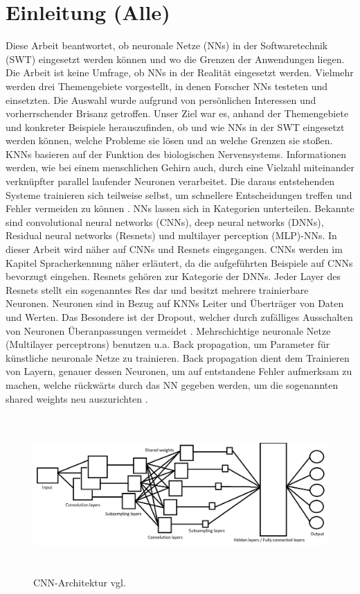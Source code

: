 \section{Einleitung (Alle)}
Diese Arbeit beantwortet, ob neuronale Netze (NNs) in der Softwaretechnik (SWT) eingesetzt werden können und wo die Grenzen der Anwendungen liegen. Die Arbeit ist keine Umfrage, ob NNs in der Realität eingesetzt werden. Vielmehr werden drei Themengebiete vorgestellt, in denen Forscher NNs testeten und einsetzten. Die Auswahl wurde aufgrund von persönlichen Interessen und vorherrschender Brisanz getroffen. Unser Ziel war es, anhand der Themengebiete und konkreter Beispiele herauszufinden, ob und wie NNs in der SWT eingesetzt werden können, welche Probleme sie lösen und an welche Grenzen sie stoßen.
KNNs basieren auf der Funktion des biologischen Nervensystems. Informationen werden, wie bei einem menschlichen Gehirn auch, durch eine Vielzahl miteinander verknüpfter parallel laufender Neuronen  verarbeitet. Die daraus entstehenden Systeme trainieren sich teilweise selbst, um schnellere Entscheidungen treffen und Fehler vermeiden zu können \cite{technology}. 
NNs lassen sich in Kategorien unterteilen. Bekannte sind convolutional neural networks (CNNs), deep neural networks (DNNs), Residual neural networks (Resnets) und multilayer perception (MLP)-NNs. In dieser Arbeit wird näher auf CNNs und Resnets eingegangen. CNNs werden im Kapitel Spracherkennung näher erläutert, da die aufgeführten Beispiele auf CNNs bevorzugt eingehen. Resnets gehören zur Kategorie der DNNs. Jeder Layer des Resnets stellt ein sogenanntes Res dar und besitzt mehrere trainierbare Neuronen. Neuronen sind in Bezug auf KNNs Leiter und Überträger von Daten und Werten. Das Besondere ist der Dropout, welcher durch zufälliges Ausschalten von Neuronen Überanpassungen vermeidet \cite{residualnn}. Mehrschichtige neuronale Netze (Multilayer perceptrons) benutzen u.a. Back propagation, um Parameter für künstliche neuronale Netze zu trainieren. Back propagation dient dem Trainieren von Layern, genauer dessen Neuronen, um auf entstandene Fehler aufmerksam zu machen, welche rückwärts durch das NN gegeben werden, um die sogenannten shared weights neu auszurichten \cite{usingcnn}.\\
\vspace{6.0cm}
\begin{figure}[h]
\includegraphics[width=\linewidth, height=6cm]{Bilder/CNN/CNNArchitektur.png}
\caption{CNN-Architektur vgl. \cite{noisycnn}}
\end{figure}
